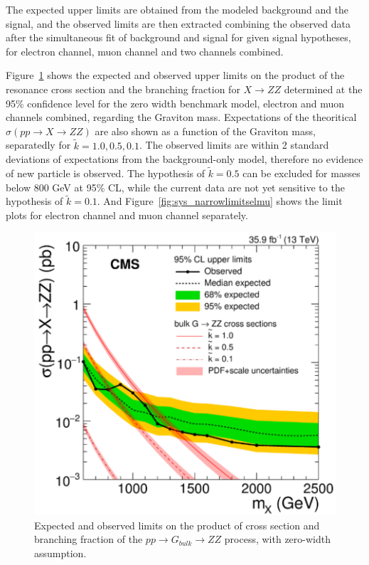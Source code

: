 \vspace{0.3cm}
The expected upper limits are obtained from the modeled background and the signal, and the observed limits are then extracted combining the observed data after the simultaneous fit of background and signal for given signal hypotheses, for electron channel, muon channel and two channels combined. 

\vspace{0.3cm}
Figure~\ref{fig:sys_narrowlimits} shows the expected and observed upper limits on the product of the resonance cross section and the branching fraction for $X\rightarrow ZZ$ determined at the 95\% confidence level for the zero width benchmark model, electron and muon channels combined, regarding the Graviton mass. Expectations of the theoritical $\sigma(pp\rightarrow X\rightarrow ZZ)$ are also shown as a function of the Graviton mass, separatedly for $\tilde{k}=1.0,0.5,0.1$. The observed limits are within 2 standard deviations of expectations from the background-only model, therefore no evidence of new particle is observed. The hypothesis of $\tilde{k}=0.5$ can be excluded for masses below 800 GeV at 95\% CL, while the current data are not yet sensitive to the hypothesis of $\tilde{k}=0.1$. And Figure~\ref{fig:sys_narrowlimitselmu} shows the limit plots for electron channel and muon channel separately.

\begin{figure}[htbp]
\begin{center}
\includegraphics[width=0.9\linewidth]{figures/sys_narrowlimit.png}
\caption{Expected and observed limits on the product of cross section and branching fraction of the $pp\rightarrow G_{bulk}\rightarrow ZZ$ process, with zero-width assumption.}
\label{fig:sys_narrowlimits}
\end{center}
\end{figure}

